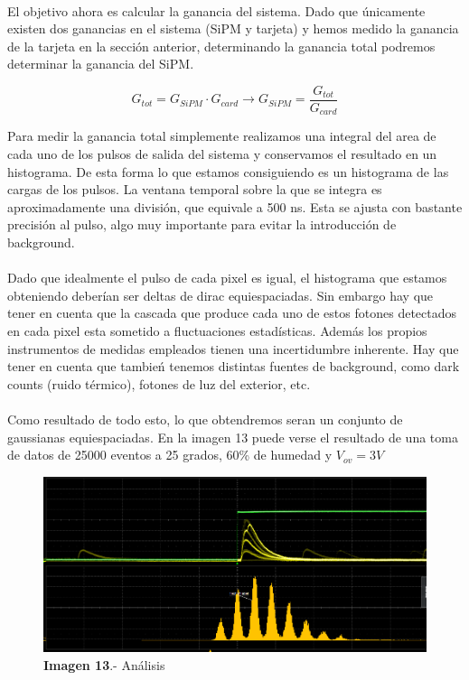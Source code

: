 \documentclass[11pt, a4paper]{article}
\begin{document}
\paragraph {}
El objetivo ahora es calcular la ganancia del sistema. Dado que únicamente existen dos ganancias en el sistema (SiPM y tarjeta) y hemos medido la ganancia de la tarjeta en la sección anterior, determinando la ganancia total podremos determinar la ganancia del SiPM. 

$$G_{tot}=G_{SiPM} \cdotp G_{card} \longrightarrow G_{SiPM} = \frac{G_{tot}}{G_{card}}$$

Para medir la ganancia total simplemente realizamos una integral del area de cada uno de los pulsos de salida del sistema y conservamos el resultado en un histograma. De esta forma lo que estamos consiguiendo es un histograma de las cargas de los pulsos. La ventana temporal sobre la que se integra es aproximadamente una división, que equivale a 500 ns. Esta se ajusta con bastante precisión al pulso, algo muy importante para evitar la introducción de background.

\paragraph {}
Dado que idealmente el pulso de cada pixel es igual, el histograma que estamos obteniendo deberían ser deltas de dirac equiespaciadas. Sin embargo hay que tener en cuenta que la cascada que produce cada uno de estos fotones detectados en cada pixel esta sometido a fluctuaciones estadísticas. Además los propios instrumentos de medidas empleados tienen una incertidumbre inherente. Hay que tener en cuenta que tambień tenemos distintas fuentes de background, como dark counts (ruido térmico), fotones de luz del exterior, etc. 

\paragraph {}
Como resultado de todo esto, lo que obtendremos seran un conjunto de gaussianas equiespaciadas. En la imagen 13 puede verse el resultado de una toma de datos de 25000 eventos a 25 grados, 60\% de humedad y $V_{ov}=3V$

\begin{figure}[hbtp]
 \centering
 \includegraphics[scale=0.2]{Analisis.png}
 \caption{\textbf{Imagen 13}.- Análisis}
 \end{figure}
\end{document}
